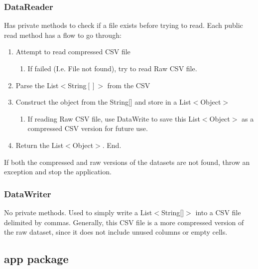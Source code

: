 \documentclass[12pt]{article}
\begin{document}
\subsubsection{DataReader}
Has private methods to check if a file exists before trying to read. Each public read method has a flow to go through:
\begin{enumerate}
\item Attempt to read compressed CSV file
	\begin{enumerate}
	\item If failed (I.e. File not found), try to read Raw CSV file.
	\end{enumerate}
\item Parse the List$<$String$[]$$>$ from the CSV
\item Construct the object from the String[] and store in a List$<$Object$>$
	\begin{enumerate}
	\item If reading Raw CSV file, use DataWrite to save this List$<$Object$>$ as a compressed CSV version for future use.
	\end{enumerate}
\item Return the List$<$Object$>$. End.
\end{enumerate}
If both the compressed and raw versions of the datasets are not found, throw an exception and stop the application.



\subsubsection{DataWriter}
No private methods. Used to simply write a List$<$String[]$>$ into a CSV file delimited by commas. Generally, this CSV file is a more compressed version of the raw dataset, since it does not include unused columns or empty cells.

\newpage
\subsection{app package}
\end{document}
